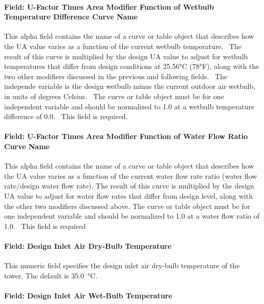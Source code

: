\paragraph{Field: U-Factor Times Area Modifier Function of Wetbulb Temperature Difference Curve Name}\label{field-u-factor-times-area-modifier-function-of-wetbulb-temperature-difference-curve-name}

This alpha field contains the name of a curve or table object that describes how the UA value varies as a function of the current wetbulb temperature.~ The result of this curve is multiplied by the design UA value to adjust for wetbulb temperatures that differ from design conditions at 25.56°C (78°F), along with the two other modifiers discussed in the previous and following fields.~ The independe variable is the design wetbulb minus the current outdoor air wetbulb, in units of degrees Celsius.~ The curve or table object must be for one independent variable and should be normalized to 1.0 at a wetbulb temperature difference of 0.0.~ This field is required.

\paragraph{Field: U-Factor Times Area Modifier Function of Water Flow Ratio Curve Name}\label{field-u-factor-times-area-modifier-function-of-water-flow-ratio-curve-name}

This alpha field contains the name of a curve or table object that describes how the UA value varies as a function of the current water flow rate ratio (water flow rate/design water flow rate). The result of this curve is multiplied by the design UA value to adjust for water flow rates that differ from design level, along with the other two modifiers discussed above. The curve or table object must be for one independent variable and should be normalized to 1.0 at a water flow ratio of 1.0.~ This field is required

\paragraph{Field: Design Inlet Air Dry-Bulb Temperature}\label{field-design-inlet-air-drybulb-temperature-2}

This numeric field specifies the design inlet air dry-bulb temperature of the tower. The default is \SI{35.0}{\celsius}.

\paragraph{Field: Design Inlet Air Wet-Bulb Temperature}\label{field-design-inlet-air-wetbulb-temperature-2}

